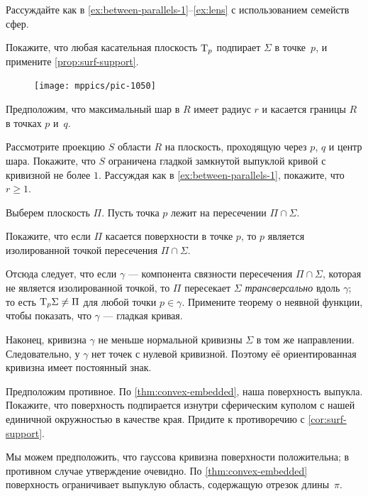 \begin{multicols}{2}
Рассуждайте как в \ref{ex:between-parallels-1}--\ref{ex:lens} с использованием семейств сфер.

Покажите, что любая касательная плоскость $\mathrm{T}_p$ подпирает $\Sigma$ в точке~$p$,
и примените \ref{prop:surf-support}.


{

\begin{figure}
\vskip-6mm
\centering
\texttt{[image: mppics/pic-1050]}
\vskip-0mm
\end{figure}

Предположим, что максимальный шар в $R$ имеет радиус $r$ и касается границы $R$ в точках $p$ и~$q$.

Рассмотрите проекцию $S$ области $R$ на плоскость, проходящую через $p$, $q$ и центр шара.
Покажите, что $S$ ограничена гладкой замкнутой выпуклой кривой с кривизной не более $1$.
Рассуждая как в \ref{ex:between-parallels-1}, покажите, что $r\ge 1$.

}

Выберем плоскость $\Pi$.
Пусть точка $p$ лежит на пересечении $\Pi\cap\Sigma$.

Покажите, что если $\Pi$ касается поверхности в точке $p$, то $p$ является изолированной точкой пересечения $\Pi\cap\Sigma$.

Отсюда следует, что если $\gamma$ --- компонента связности пересечения $\Pi\cap\Sigma$, которая не является изолированной точкой, то $\Pi$ пересекает $\Sigma$ \emph{трансверсально} вдоль $\gamma$; то есть $\mathrm{T}_p\Sigma\ne\Pi$ для любой точки $p \in \gamma$. Примените теорему о неявной функции, чтобы показать, что $\gamma$ --- гладкая кривая.

Наконец, кривизна $\gamma$ не меньше нормальной кривизны $\Sigma$ в том же направлении.
Следовательно, у $\gamma$ нет точек с нулевой кривизной.
Поэтому её ориентированная кривизна имеет постоянный знак.

Предположим противное.
По \ref{thm:convex-embedded}, наша поверхность выпукла.
Покажите, что поверхность подпирается изнутри сферическим куполом с нашей единичной окружностью в качестве края.
Придите к противоречию с \ref{cor:surf-support}.

Мы можем предположить, что гауссова кривизна поверхности положительна; в противном случае утверждение очевидно.
По \ref{thm:convex-embedded} поверхность ограничивает выпуклую область, содержащую отрезок длины~$\pi$.


\end{multicols}
